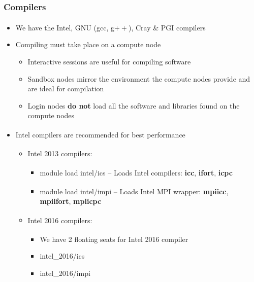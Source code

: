 \documentclass[t,hyperref={pdfpagelabels=false}]{beamer}
\newcommand{\regtrademark}{\fontsize{5}{6}\selectfont \textsuperscript{\textregistered}}
\newcommand{\intel}{Intel{\regtrademark}}
\newcommand{\cray}{Cray{\regtrademark}}
\begin{document}
\begin{frame}
\frametitle{Compilers}
	\begin{itemize}
		\item We have the {\intel}, GNU (gcc, g$++$), {\cray} \& PGI{\regtrademark} compilers
		\item Compiling must take place on a compute node
		\begin{itemize}
			\item Interactive sessions are useful for compiling software
			\item Sandbox nodes mirror the environment the compute nodes provide and are ideal for compilation
			\item Login nodes \textbf{do not} load all the software and libraries found on the compute nodes
		\end{itemize}
		\item {\intel} compilers are recommended for best performance
		\begin{itemize}
			\item {\intel} 2013 compilers:
			\begin{itemize}
				\item module load intel/ics -- Loads {\intel} compilers: {\tiny \textbf{icc}, \textbf{ifort}, \textbf{icpc}}
				\item module load intel/impi -- Loads {\intel} MPI wrapper: {\tiny\textbf{mpiicc}, \textbf{mpiifort}, \textbf{mpiicpc}}
			\end{itemize}
			\item {\intel} 2016 compilers:
			\begin{itemize}
				\item We have 2 floating seats for {\intel} 2016 compiler
				\item intel\_2016/ics 
				\item intel\_2016/impi 
			\end{itemize}
		\end{itemize}			
	\end{itemize}
\end{frame}
\end{document}

